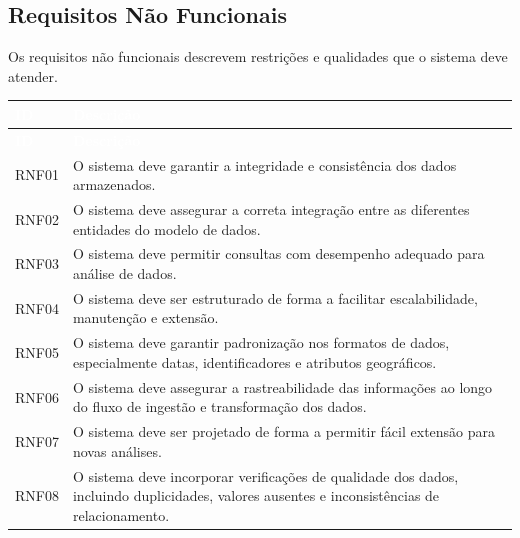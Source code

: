\documentclass[12pt,a4paper]{article}
\begin{document}
\subsection{Requisitos Não Funcionais}

Os requisitos não funcionais descrevem restrições e qualidades que o sistema deve atender.

\begin{longtable}{|>{\RaggedRight\arraybackslash}p{2cm}|>{\RaggedRight\arraybackslash}p{12cm}|}
    \hline
    \rowcolor{AzulCorporativo}
    \textcolor{white}{\textbf{ID}} &
    \textcolor{white}{\textbf{Descrição}} \\ \hline
    \endfirsthead

    \hline
    \rowcolor{AzulCorporativo}
    \textcolor{white}{\textbf{ID}} &
    \textcolor{white}{\textbf{Descrição}} \\ \hline
    \endhead

    RNF01 & O sistema deve garantir a integridade e consistência dos dados armazenados. \\ \hline

    RNF02 & O sistema deve assegurar a correta integração entre as diferentes entidades do modelo de dados. \\ \hline

    RNF03 & O sistema deve permitir consultas com desempenho adequado para análise de dados. \\ \hline

    RNF04 & O sistema deve ser estruturado de forma a facilitar escalabilidade, manutenção e extensão. \\ \hline

    RNF05 & O sistema deve garantir padronização nos formatos de dados, especialmente datas, identificadores e atributos geográficos. \\ \hline

    RNF06 & O sistema deve assegurar a rastreabilidade das informações ao longo do fluxo de ingestão e transformação dos dados. \\ \hline

    RNF07 & O sistema deve ser projetado de forma a permitir fácil extensão para novas análises. \\ \hline

    RNF08 & O sistema deve incorporar verificações de qualidade dos dados, incluindo duplicidades, valores ausentes e inconsistências de relacionamento. \\ \hline
\end{longtable}
\end{document}
